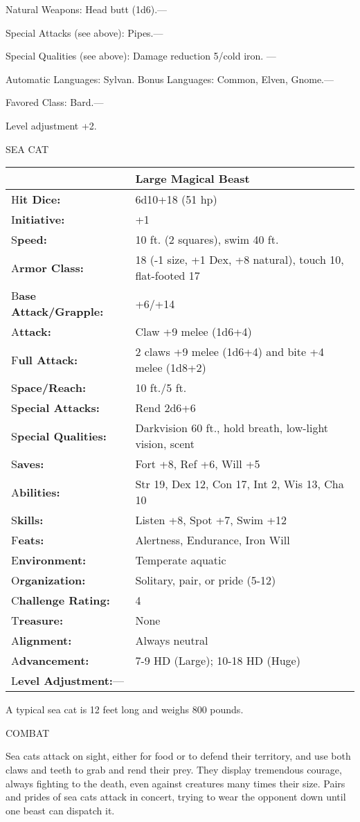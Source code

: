 \documentclass{article}
\begin{document}
\parindent=0pt
Natural Weapons: Head butt (1d6).---

Special Attacks (see above): Pipes.---

Special Qualities (see above): Damage reduction 5/cold iron. ---

Automatic Languages: Sylvan. Bonus Languages: Common, Elven, Gnome.---

Favored Class: Bard.---

Level adjustment +2.

\vspace{12pt}
{\LARGE{}SEA CAT}

\begin{tabular}{|>{\raggedright}p{91pt}|>{\raggedright}p{226pt}|}
\hline
  & Large Magical Beast\tabularnewline
\hline
H\textbf{it Dice:} & 6d10+18 (51 hp)\tabularnewline
\hline
I\textbf{nitiative:} & +1\tabularnewline
\hline
S\textbf{peed:} & 10 ft. (2 squares), swim 40 ft.\tabularnewline
\hline
A\textbf{rmor Class:} & 18 (-1 size, +1 Dex, +8 natural), touch 10, flat-footed 
17\tabularnewline
\hline
B\textbf{ase Attack/Grapple:} & +6/+14\tabularnewline
\hline
A\textbf{ttack:} & Claw +9 melee (1d6+4)\tabularnewline
\hline
F\textbf{ull Attack:} & 2 claws +9 melee (1d6+4) and bite +4 melee (1d8+2)\tabularnewline
\hline
S\textbf{pace/Reach:} & 10 ft./5 ft.\tabularnewline
\hline
S\textbf{pecial Attacks:} & Rend 2d6+6\tabularnewline
\hline
S\textbf{pecial Qualities:} & Darkvision 60 ft., hold breath, low-light vision, 
scent\tabularnewline
\hline
S\textbf{aves:} & Fort +8, Ref +6, Will +5\tabularnewline
\hline
A\textbf{bilities:} & Str 19, Dex 12, Con 17, Int 2, Wis 13, Cha 10\tabularnewline
\hline
S\textbf{kills:} & Listen +8, Spot +7, Swim +12\tabularnewline
\hline
F\textbf{eats:} & Alertness, Endurance, Iron Will\tabularnewline
\hline
E\textbf{nvironment:} & Temperate aquatic\tabularnewline
\hline
O\textbf{rganization:} & Solitary, pair, or pride (5-12)\tabularnewline
\hline
C\textbf{hallenge Rating:} & 4\tabularnewline
\hline
T\textbf{reasure:} & None\tabularnewline
\hline
A\textbf{lignment:} & Always neutral\tabularnewline
\hline
A\textbf{dvancement:} & 7-9 HD (Large); 10-18 HD (Huge)\tabularnewline
\hline
L\textbf{evel Adjustment:}--- & \tabularnewline
\hline
\end{tabular}

A typical sea cat is 12 feet long and weighs 800 pounds.

COMBAT

Sea cats attack on sight, either for food or to defend their territory, and use 
both claws and teeth to grab and rend their prey. They display tremendous courage, 
always fighting to the death, even against creatures many times their size. Pairs 
and prides of sea cats attack in concert, trying to wear the opponent down until 
one beast can dispatch it.
\end{document}
